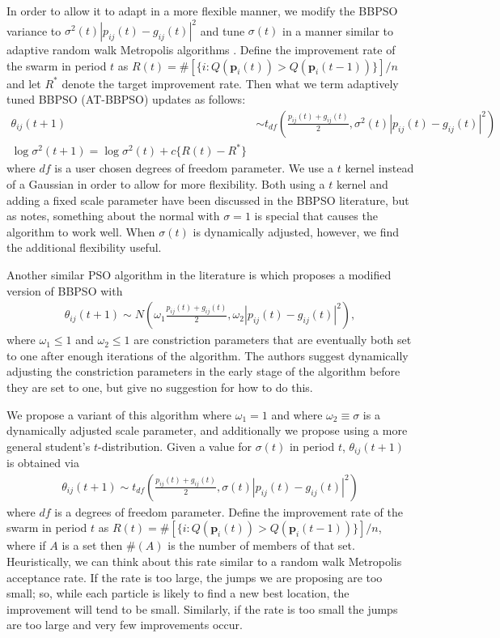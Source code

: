 \documentclass[12pt]{article}
\begin{document}
In order to allow it to adapt in a more flexible manner, we modify the BBPSO variance to $\sigma^2(t)|p_{ij}(t) - g_{ij}(t)|^2$ and tune $\sigma(t)$ in a manner similar to adaptive random walk Metropolis algorithms \citep{andrieu2008tutorial}. Define the improvement rate of the swarm in period $t$ as $R(t) = \#[\{i:Q(\bm{p}_i(t))> Q(\bm{p}_i(t-1))\}]/n$ and let $R^*$ denote the target improvement rate. Then what we term adaptively tuned BBPSO (AT-BBPSO) updates as follows:
\begin{align}\label{eq:at-bbpso}
\theta_{ij}(t+1) &\sim t_{df}\left(\frac{p_{ij}(t) + g_{ij}(t)}{2}, \sigma^2(t)|p_{ij}(t) - g_{ij}(t)|^2\right)\\\nonumber
\log \sigma^2(t+1) = \log\sigma^2(t) + c\{R(t) - R^*\}
\end{align}
where $df$ is a user chosen degrees of freedom parameter. We use a $t$ kernel instead of a Gaussian in order to allow for more flexibility. Both using a $t$ kernel and adding a fixed scale parameter have been discussed in the BBPSO literature, but as \citet{kennedy2003bare} notes, something about the normal with $\sigma=1$ is special that causes the algorithm to work well. When $\sigma(t)$ is dynamically adjusted, however, we find the additional flexibility useful. 

Another similar PSO algorithm in the literature is \citet{hsieh2010modified} which proposes a modified version of BBPSO with 
\begin{align*}
\theta_{ij}(t+1) \sim N\left(\omega_1\frac{p_{ij}(t) + g_{ij}(t)}{2}, \omega_2|p_{ij}(t) - g_{ij}(t)|^2\right),
\end{align*}
where $\omega_1\leq 1$ and $\omega_2\leq 1$ are constriction parameters that are eventually both set to one after enough iterations of the algorithm. The authors suggest dynamically adjusting the constriction parameters in the early stage of the algorithm before they are set to one, but give no suggestion for how to do this. 

We propose a variant of this algorithm where $\omega_1=1$ and where $\omega_2\equiv\sigma$ is a dynamically adjusted scale parameter, and additionally we propose using a more general student's $t$-distribution. Given a value for $\sigma(t)$ in period $t$, $\theta_{ij}(t+1)$ is obtained via
\begin{align}\label{eq:at-bbpso}
\theta_{ij}(t+1) \sim t_{df}\left(\frac{p_{ij}(t) + g_{ij}(t)}{2}, \sigma(t)|p_{ij}(t) - g_{ij}(t)|^2\right)
\end{align}
where $df$ is a degrees of freedom parameter. Define the improvement rate of the swarm in period $t$ as $R(t) = \#[\{i:Q(\bm{p}_i(t))> Q(\bm{p}_i(t-1))\}]/n$, where if $A$ is a set then $\#(A)$ is the number of members of that set. Heuristically, we can think about this rate similar to a random walk Metropolis acceptance rate. If the rate is too large, the jumps we are proposing are too small; so, while each particle is likely to find a new best location, the improvement will tend to be small. Similarly, if the rate is too small the jumps are too large and very few improvements occur. 
\end{document}
